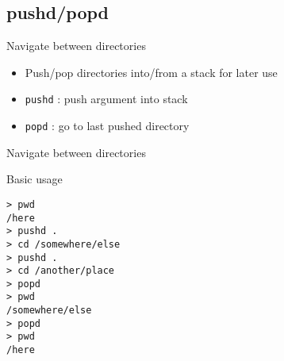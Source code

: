 \subsection{pushd/popd}

\begin{frame}[fragile]{Navigate between directories}
  \begin{itemize}
    \pause \item Push/pop directories into/from a stack for later use
    \pause \item \texttt{pushd} : push argument into stack
    \pause \item \texttt{popd} : go to last pushed directory
  \end{itemize}
\end{frame}

\begin{frame}[fragile]{Navigate between directories}
  \begin{exampleblock}{Basic usage}
    \begin{lstlisting}[showstringspaces=false,basicstyle=\tiny]
> pwd
/here
> pushd .
> cd /somewhere/else
> pushd .
> cd /another/place
> popd
> pwd
/somewhere/else
> popd
> pwd
/here
    \end{lstlisting}
  \end{exampleblock}
\end{frame}


